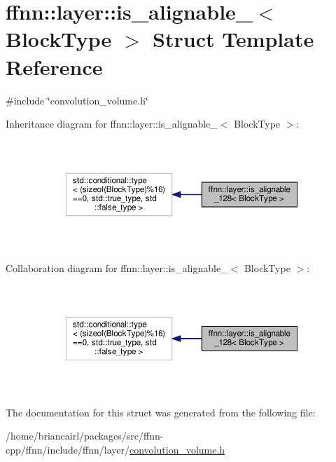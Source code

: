 \hypertarget{structffnn_1_1layer_1_1is__alignable__128}{\section{ffnn\-:\-:layer\-:\-:is\-\_\-alignable\-\_$<$ Block\-Type $>$ Struct Template Reference}
\label{structffnn_1_1layer_1_1is__alignable__128}
}


{\ttfamily \#include \char`\"{}convolution\-\_\-volume.\-h\char`\"{}}



Inheritance diagram for ffnn\-:\-:layer\-:\-:is\-\_\-alignable\-\_$<$ Block\-Type $>$\-:
\nopagebreak
\begin{figure}[H]
\begin{center}
\leavevmode
\includegraphics[width=350pt]{structffnn_1_1layer_1_1is__alignable__128__inherit__graph}
\end{center}
\end{figure}


Collaboration diagram for ffnn\-:\-:layer\-:\-:is\-\_\-alignable\-\_$<$ Block\-Type $>$\-:
\nopagebreak
\begin{figure}[H]
\begin{center}
\leavevmode
\includegraphics[width=350pt]{structffnn_1_1layer_1_1is__alignable__128__coll__graph}
\end{center}
\end{figure}


The documentation for this struct was generated from the following file\-:\begin{DoxyCompactItemize}
\item 
/home/briancairl/packages/src/ffnn-\/cpp/ffnn/include/ffnn/layer/\hyperlink{convolution__volume_8h}{convolution\-\_\-volume.\-h}\end{DoxyCompactItemize}

